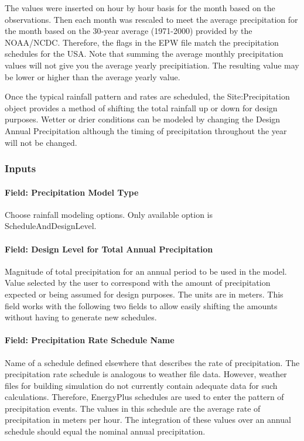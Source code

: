 The values were inserted on hour by hour basis for the month based on the observations. Then each month was rescaled to meet the average precipitation for the month based on the 30-year average (1971-2000) provided by the NOAA/NCDC. Therefore, the flags in the EPW file match the precipitation schedules for the USA. Note that summing the average monthly precipitation values will not give you the average yearly precipitiation. The resulting value may be lower or higher than the average yearly value.

Once the typical rainfall pattern and rates are scheduled, the Site:Precipitation object provides a method of shifting the total rainfall up or down for design purposes. Wetter or drier conditions can be modeled by changing the Design Annual Precipitation although the timing of precipitation throughout the year will not be changed.

\subsubsection{Inputs}\label{inputs-22-002}

\paragraph{Field: Precipitation Model Type}\label{field-precipitation-model-type}

Choose rainfall modeling options. Only available option is ScheduleAndDesignLevel.

\paragraph{Field: Design Level for Total Annual Precipitation}\label{field-design-level-for-total-annual-precipitation}

Magnitude of total precipitation for an annual period to be used in the model. Value selected by the user to correspond with the amount of precipitation expected or being assumed for design purposes. The units are in meters. This field works with the following two fields to allow easily shifting the amounts without having to generate new schedules.

\paragraph{Field: Precipitation Rate Schedule Name}\label{field-precipitation-rate-schedule-name}

Name of a schedule defined elsewhere that describes the rate of precipitation. The precipitation rate schedule is analogous to weather file data. However, weather files for building simulation do not currently contain adequate data for such calculations. Therefore, EnergyPlus schedules are used to enter the pattern of precipitation events. The values in this schedule are the average rate of precipitation in meters per hour. The integration of these values over an annual schedule should equal the nominal annual precipitation.

